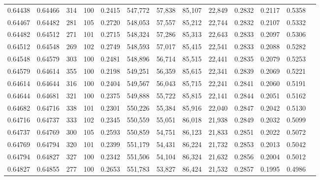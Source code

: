 \begin{tabular}{rrrrrrrrrrrrr}
0.64438 & 0.64466 &   314 & 100 &                                     0.2415 & 547,772 &  57,838 &  85,107 &  22,849 & 0.2832 & 0.2117 & 0.5358 \\
0.64467 & 0.64482 &   281 & 105 &                                     0.2720 & 548,053 &  57,557 &  85,212 &  22,744 & 0.2832 & 0.2107 & 0.5332 \\
0.64482 & 0.64512 &   271 & 101 &                                     0.2715 & 548,324 &  57,286 &  85,313 &  22,643 & 0.2833 & 0.2097 & 0.5306 \\
0.64512 & 0.64548 &   269 & 102 &                                     0.2749 & 548,593 &  57,017 &  85,415 &  22,541 & 0.2833 & 0.2088 & 0.5282 \\
0.64548 & 0.64579 &   303 & 100 &                                     0.2481 & 548,896 &  56,714 &  85,515 &  22,441 & 0.2835 & 0.2079 & 0.5253 \\
0.64579 & 0.64614 &   355 & 100 &                                     0.2198 & 549,251 &  56,359 &  85,615 &  22,341 & 0.2839 & 0.2069 & 0.5221 \\
0.64614 & 0.64644 &   316 & 100 &                                     0.2404 & 549,567 &  56,043 &  85,715 &  22,241 & 0.2841 & 0.2060 & 0.5191 \\
0.64644 & 0.64681 &   321 & 100 &                                     0.2375 & 549,888 &  55,722 &  85,815 &  22,141 & 0.2844 & 0.2051 & 0.5162 \\
0.64682 & 0.64716 &   338 & 101 &                                     0.2301 & 550,226 &  55,384 &  85,916 &  22,040 & 0.2847 & 0.2042 & 0.5130 \\
0.64716 & 0.64737 &   333 & 102 &                                     0.2345 & 550,559 &  55,051 &  86,018 &  21,938 & 0.2849 & 0.2032 & 0.5099 \\
0.64737 & 0.64769 &   300 & 105 &                                     0.2593 & 550,859 &  54,751 &  86,123 &  21,833 & 0.2851 & 0.2022 & 0.5072 \\
0.64769 & 0.64794 &   320 & 101 &                                     0.2399 & 551,179 &  54,431 &  86,224 &  21,732 & 0.2853 & 0.2013 & 0.5042 \\
0.64794 & 0.64827 &   327 & 100 &                                     0.2342 & 551,506 &  54,104 &  86,324 &  21,632 & 0.2856 & 0.2004 & 0.5012 \\
0.64827 & 0.64855 &   277 & 100 &                                     0.2653 & 551,783 &  53,827 &  86,424 &  21,532 & 0.2857 & 0.1995 & 0.4986 \\

\end{tabular}

